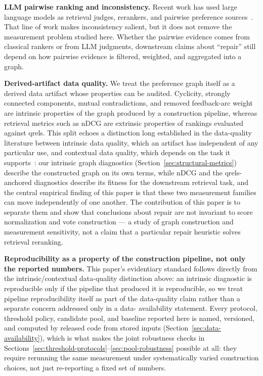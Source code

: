 \documentclass[manuscript,anonymous,review]{acmart}
\begin{document}
\textbf{LLM pairwise ranking and inconsistency.} Recent work has used large
language models as retrieval judges, rerankers, and pairwise preference
sources~\cite{sun-etal-2023-chatgpt,qin-etal-2024-large}. That line of work
makes inconsistency salient, but it does not remove the measurement problem
studied here. Whether the pairwise evidence comes from classical rankers or
from LLM judgments, downstream claims about ``repair'' still depend on how
pairwise evidence is filtered, weighted, and aggregated into a graph.

\textbf{Derived-artifact data quality.} We treat the preference graph itself as
a derived data artifact whose properties can be audited. Cyclicity, strongly
connected components, mutual contradictions, and removed feedback-arc weight
are intrinsic properties of the graph produced by a construction pipeline,
whereas retrieval metrics such as nDCG are extrinsic properties of rankings
evaluated against qrels. This split echoes a distinction long established in
the data-quality literature between intrinsic data quality, which an artifact
has independent of any particular use, and contextual data quality, which
depends on the task it supports~\cite{wang1996beyond}: our intrinsic graph
diagnostics (Section~\ref{sec:structural-metrics}) describe the constructed
graph on its own terms, while nDCG and the qrels-anchored diagnostics describe
its fitness for the downstream retrieval task, and the central empirical
finding of this paper is that these two measurement families can move
independently of one another. The contribution of this paper is to separate
them and show that conclusions about repair are not invariant to score
normalization and vote construction --- a study of graph construction and
measurement sensitivity, not a claim that a particular repair heuristic solves
retrieval reranking.

\textbf{Reproducibility as a property of the construction pipeline, not only
the reported numbers.} This paper's evidentiary standard follows directly
from the intrinsic/contextual data-quality distinction above: an intrinsic
diagnostic is reproducible only if the pipeline that produced it is
reproducible, so we treat pipeline reproducibility itself as part of the
data-quality claim rather than a separate concern addressed only in a data-
availability statement. Every protocol, threshold policy, candidate pool,
and baseline reported here is named, versioned, and computed by released
code from stored inputs (Section~\ref{sec:data-availability}), which is what
makes the joint robustness checks in
Sections~\ref{sec:threshold-protocols}--\ref{sec:pool-robustness} possible
at all: they require rerunning the same measurement under systematically
varied construction choices, not just re-reporting a fixed set of numbers.
\end{document}
